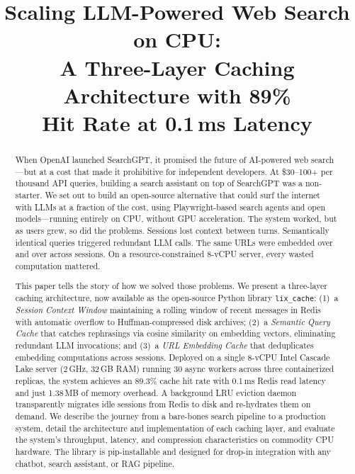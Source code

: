 \documentclass[conference]{IEEEtran}
\title{Scaling LLM-Powered Web Search on CPU:\\A Three-Layer Caching Architecture with 89\%\\Hit Rate at 0.1\,ms Latency}
\author{
\IEEEauthorblockN{Ayushman Bhattacharya}
\IEEEauthorblockA{MyceliAI AÜ\\ayushman@myceli.ai}
}
\begin{document}
\maketitle

\begin{abstract}
When OpenAI launched SearchGPT, it promised the future of AI-powered web search---but at a cost that made it prohibitive for independent developers. At \$30--100+ per thousand API queries, building a search assistant on top of SearchGPT was a non-starter. We set out to build an open-source alternative that could surf the internet with LLMs at a fraction of the cost, using Playwright-based search agents and open models---running entirely on CPU, without GPU acceleration. The system worked, but as users grew, so did the problems. Sessions lost context between turns. Semantically identical queries triggered redundant LLM calls. The same URLs were embedded over and over across sessions. On a resource-constrained 8-vCPU server, every wasted computation mattered.

This paper tells the story of how we solved those problems. We present a three-layer caching architecture, now available as the open-source Python library \texttt{lix\_cache}: (1)~a \emph{Session Context Window} maintaining a rolling window of recent messages in Redis with automatic overflow to Huffman-compressed disk archives; (2)~a \emph{Semantic Query Cache} that catches rephrasings via cosine similarity on embedding vectors, eliminating redundant LLM invocations; and (3)~a \emph{URL Embedding Cache} that deduplicates embedding computations across sessions. Deployed on a single 8-vCPU Intel Cascade Lake server (2\,GHz, 32\,GB RAM) running 30 async workers across three containerized replicas, the system achieves an 89.3\% cache hit rate with 0.1\,ms Redis read latency and just 1.38\,MB of memory overhead. A background LRU eviction daemon transparently migrates idle sessions from Redis to disk and re-hydrates them on demand. We describe the journey from a bare-bones search pipeline to a production system, detail the architecture and implementation of each caching layer, and evaluate the system's throughput, latency, and compression characteristics on commodity CPU hardware. The library is pip-installable and designed for drop-in integration with any chatbot, search assistant, or RAG pipeline.
\end{abstract}
\end{document}

